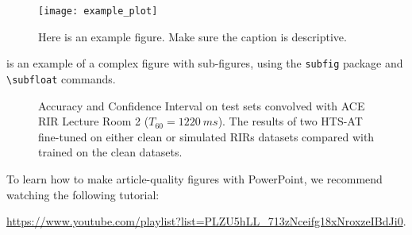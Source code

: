 \documentclass[a4paper,12pt,twoside,openany]{book}
\begin{document}
    \begin{figure}[h]
        \centering
        \texttt{[image: example\_plot]}
        \caption{Here is an example figure. Make sure the caption is descriptive.}
        \label{fig:myfigure}
    \end{figure}

     is an example of a complex figure with sub-figures, using the \texttt{subfig} package and \texttt{\textbackslash subfloat} commands.

    \begin{figure}[h]
        \centering
        \centering
        \caption{Accuracy and Confidence Interval on test sets convolved with ACE RIR Lecture Room 2 ($T_{60}=1220~ms$). The results of two HTS-AT fine-tuned on either clean or simulated RIRs datasets compared with trained on the clean datasets.}
        \label{fig:HTS-AT_VS_BLSTM}
    \end{figure}
    
    To learn how to make article-quality figures with PowerPoint, we recommend watching the following tutorial: 
    
    \url{https://www.youtube.com/playlist?list=PLZU5hLL_713zNceifg18xNroxzeIBdJi0}.
     
\end{document}
